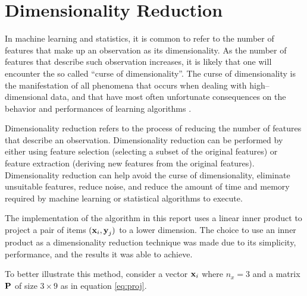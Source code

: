 \section{Dimensionality Reduction} \label{sect:theory:dim-reduction}
In machine learning and statistics, it is common to refer to the number of features that make up an observation as its dimensionality. As the number of features that describe such observation increases, it is likely that one will encounter the so called ``curse of dimensionality''. The curse of dimensionality is the manifestation of all phenomena that occurs when dealing with high--dimensional data, and that have most often unfortunate consequences on the behavior and performances of learning algorithms \cite{article:curse-of-dim}. \newline

Dimensionality reduction refers to the process of reducing the number of features that describe an observation. Dimensionality reduction can be performed by either using feature selection (selecting a subset of the original features) or feature extraction (deriving new features from the original features). Dimensionality reduction can help avoid the curse of dimensionality, eliminate unsuitable features, reduce noise, and reduce the amount of time and memory required by machine learning or statistical algorithms to execute. \newline

The implementation of the \mlblink algorithm in this report uses a linear inner product to project a pair of items $(\boldsymbol{\mathbf{x}}_i, \boldsymbol{\mathbf{y}}_j)$ to a lower dimension. The choice to use an inner product as a dimensionality reduction technique was made due to its simplicity, performance, and the results it was able to achieve. \newline

To better illustrate this method, consider a vector $\boldsymbol{\mathbf{x}}_i$ where $n_x=3$ and a matrix $\boldsymbol{\mathbf{P}}$ of size $3 \times 9$ as in equation \ref{eq:proj}.

